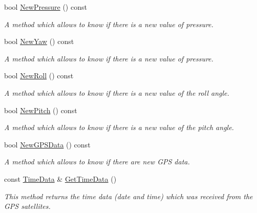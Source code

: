 \begin{DoxyCompactItemize}
bool \hyperlink{classGPSInterface_a88d33d42e29b20e62619fc5c217868ae}{New\+Pressure} () const
\begin{DoxyCompactList}\small\item\em A method which allows to know if there is a new value of pressure. \end{DoxyCompactList}\item 
bool \hyperlink{classGPSInterface_afdd55479e220aa489095de6034f644c7}{New\+Yaw} () const
\begin{DoxyCompactList}\small\item\em A method which allows to know if there is a new value of pressure. \end{DoxyCompactList}\item 
bool \hyperlink{classGPSInterface_a89f1f28d2effdc31de745b7496e6f09a}{New\+Roll} () const
\begin{DoxyCompactList}\small\item\em A method which allows to know if there is a new value of the roll angle. \end{DoxyCompactList}\item 
bool \hyperlink{classGPSInterface_ab0f5da64a7320e246bc49fa869f498f5}{New\+Pitch} () const
\begin{DoxyCompactList}\small\item\em A method which allows to know if there is a new value of the pitch angle. \end{DoxyCompactList}\item 
bool \hyperlink{classGPSInterface_a5972705822baff825ef090a99b215f55}{New\+G\+P\+S\+Data} () const
\begin{DoxyCompactList}\small\item\em A method which allows to know if there are new G\+PS data. \end{DoxyCompactList}\item 
\mbox{\label{classGPSInterface_acf5b6366242ce4828ba13d13f692b744}} 
const \hyperlink{structTimeData}{Time\+Data} \& \hyperlink{classGPSInterface_acf5b6366242ce4828ba13d13f692b744}{Get\+Time\+Data} ()
\begin{DoxyCompactList}\small\item\em This method returns the time data (date and time) which was received from the G\+PS satellites. \end{DoxyCompactList}\item 
\mbox{\label{classGPSInterface_a21b7fb470d3e3641f9456a249e7df492}} 

\end{DoxyCompactItemize}
